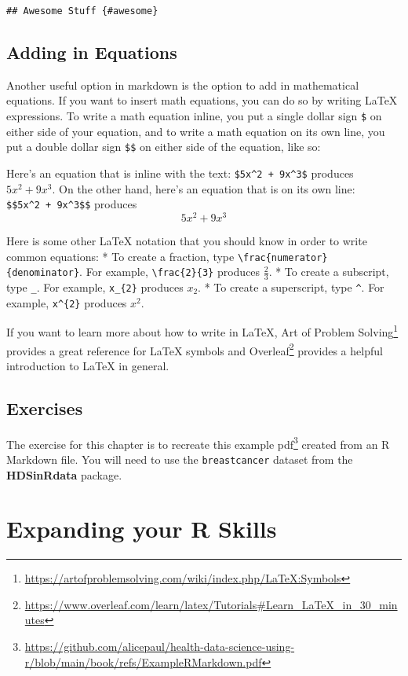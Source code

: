 \documentclass[
  letterpaper,
]{krantz}
\renewcommand{\href}[2]{#2\footnote{\url{#1}}}
\begin{document}
\texttt{\#\#\ Awesome\ Stuff\ \{\#awesome\}}

\section{Adding in Equations}\label{adding-in-equations}

Another useful option in markdown is the option to add in mathematical
equations. If you want to insert math equations, you can do so by
writing LaTeX expressions. To write a math equation inline, you put a
single dollar sign \texttt{\$} on either side of your equation, and to
write a math equation on its own line, you put a double dollar sign
\texttt{\$\$} on either side of the equation, like so:

Here's an equation that is inline with the text:
\texttt{\$5x\^{}2\ +\ 9x\^{}3\$} produces \(5x^2 + 9x^3\). On the other
hand, here's an equation that is on its own line:
\texttt{\$\$5x\^{}2\ +\ 9x\^{}3\$\$} produces \[5x^2 + 9x^3\]

Here is some other LaTeX notation that you should know in order to write
common equations: * To create a fraction, type
\texttt{\textbackslash{}frac\{numerator\}\{denominator\}}. For example,
\texttt{\textbackslash{}frac\{2\}\{3\}} produces \(\frac{2}{3}\). * To
create a subscript, type \texttt{\_}. For example, \texttt{x\_\{2\}}
produces \(x_2\). * To create a superscript, type \texttt{\^{}}. For
example, \texttt{x\^{}\{2\}} produces \(x^2\).

If you want to learn more about how to write in LaTeX,
\href{https://artofproblemsolving.com/wiki/index.php/LaTeX:Symbols}{Art
of Problem Solving} provides a great reference for LaTeX symbols and
\href{https://www.overleaf.com/learn/latex/Tutorials\#Learn_LaTeX_in_30_minutes}{Overleaf}
provides a helpful introduction to LaTeX in general.

\section{Exercises}\label{exercises-10}

The exercise for this chapter is to recreate
\href{https://github.com/alicepaul/health-data-science-using-r/blob/main/book/refs/ExampleRMarkdown.pdf}{this
example pdf} created from an R Markdown file. You will need to use the
\texttt{breastcancer} dataset from the \textbf{HDSinRdata} package.

\chapter{Expanding your R Skills}\label{sec-expanding-skills}
\end{document}
